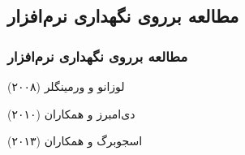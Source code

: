 \label{studies_on_software_maintenance}

\subsection{مطالعه برروی نگهداری نرم‌افزار}
\begin{frame}
\frametitle{مطالعه برروی نگهداری نرم‌افزار}

\begin{block}{لوزانو و ورمینگلر (۲۰۰۸)}
\end{block}

\begin{block}{دی‌امبرز و همکاران (۲۰۱۰)}
\end{block}

\begin{block}{اسجوبرگ و همکاران (۲۰۱۳)}
\end{block}

\end{frame}
